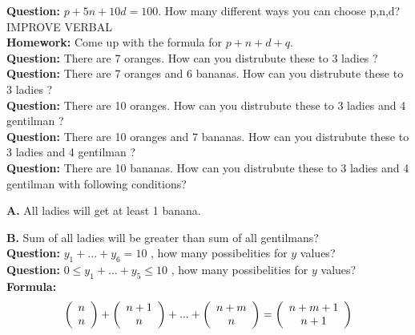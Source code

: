 \documentclass[11pt]{article}
\begin{document}
\textbf{Question: }  $p+5n+10d = 100$. How many different ways you can choose p,n,d?
\\ %

IMPROVE VERBAL
\\

\textbf{Homework: } Come up with the formula for $p+n+d+q$.
\\ %

\textbf{Question: }  There are 7 oranges. How can you distrubute these to 3 ladies ?
\\ %

\textbf{Question: }  There are 7 oranges and 6 bananas. How can you distrubute these to 3 ladies ?
\\ %

\textbf{Question: }  There are 10 oranges. How can you distrubute these to 3 ladies and 4 gentilman ?
\\ %

\textbf{Question: }  There are 10 oranges and 7 bananas. How can you distrubute these to 3 ladies and 4 gentilman ?
\\ %

\textbf{Question: }  There are 10 bananas. How can you distrubute these to 3 ladies and 4 gentilman with following conditions?
\par %
\textbf{A.} All ladies will get at least 1 banana.

\textbf{B.} Sum of all ladies will be greater than sum of all gentilmans?
\\

\textbf{Question: } $y_1 + ... + y_6 = 10$ , how many possibelities for $y$ values?
\\ %

\textbf{Question: } $0 \leq y_1 + ... + y_5 \leq 10$ , how many possibelities for $y$ values?
\\ %

\textbf{Formula: } $$\left( {\begin{array}{*{20}c} n \\ n \\ \end{array}} \right) +  \left( {\begin{array}{*{20}c} n+1 \\ n \\ \end{array}} \right) + ... +  \left( {\begin{array}{*{20}c} n+m \\ n \\ \end{array}} \right) =  \left( {\begin{array}{*{20}c} n+m+1 \\ n+1 \\ \end{array}} \right)$$
\end{document}
